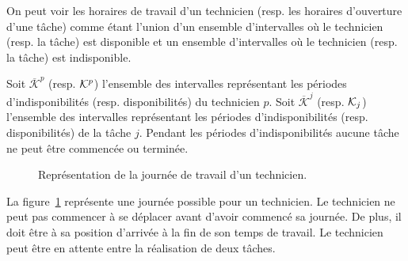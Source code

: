 On peut voir les horaires de travail d'un technicien (resp. les horaires d'ouverture d'une tâche) comme étant l'union d'un ensemble d'intervalles où le technicien (resp. la tâche) est disponible et un ensemble d'intervalles où le technicien (resp. la tâche) est indisponible. 

Soit $\overline{\mathcal{K}}^p$ (resp. $\mathcal{K}^{p}$) l'ensemble des intervalles représentant les périodes d'indisponibilités (resp. disponibilités) du technicien $p$.
Soit $\overline{\mathcal{K}}^j$ (resp. $\mathcal{K}_{j}$) l'ensemble des intervalles représentant les périodes d'indisponibilités (resp. disponibilités) de la tâche $j$.
Pendant les périodes d'indisponibilités aucune tâche ne peut être commencée ou terminée.

\begin{figure}[H]
\centering
{}
  
\caption{Représentation de la journée de travail d'un technicien.\label{fig:timelineTech}}
\end{figure}

La figure~\ref{fig:timelineTech} représente une journée possible pour un technicien. Le technicien ne peut pas commencer à se déplacer avant d'avoir commencé sa journée. De plus, il doit être à sa position d'arrivée à la fin de son temps de travail. Le technicien peut être en attente entre la réalisation de deux tâches.


